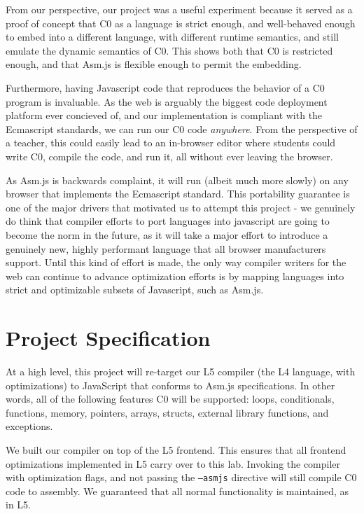 \documentclass[twoside]{article}
\begin{document}
\begin{multicols}{2}
From our perspective, our project was a useful experiment because it served 
as a proof of concept that C0 as a language is strict enough, and well-behaved
enough to embed into a different language, with different runtime semantics, 
and still emulate the dynamic semantics of C0. This shows
both that C0 is restricted enough, and that Asm.js is flexible enough to permit the 
embedding. 

Furthermore, having Javascript code that reproduces the behavior of a 
C0 program is invaluable. As the web is arguably the biggest code deployment 
platform ever concieved of, and our implementation is compliant with the 
Ecmascript standards, we can run our C0 code \emph{anywhere}. 
From the perspective of a teacher, this could easily lead to an in-browser editor 
where students could write C0, compile the code, and run it, all without ever 
leaving the browser.

As Asm.js is backwards complaint, it will run (albeit much more slowly) on 
any browser that implements the Ecmascript standard. This portability guarantee
is one of the major drivers that motivated us to attempt this project - we
genuinely do think that compiler efforts to port languages into javascript 
are going to become the norm in the future, as it will take a major effort
to introduce a genuinely new, highly performant language that all browser 
manufacturers support. Until this kind of effort is made, the only way compiler
writers for the web can continue to advance optimization efforts is by 
mapping languages into strict and optimizable subsets of Javascript, such as 
Asm.js. 


\section{Project Specification}

At a high level, this project will re-target our L5 compiler (the L4 language,
with optimizations) to JavaScript that conforms to Asm.js specifications. In other
words, all of the following features C0 will be supported: loops, conditionals,
functions, memory, pointers, arrays, structs, external library functions, and
exceptions.

  We built our compiler on top of the L5 frontend. This ensures that all 
  frontend optimizations implemented in L5 carry over to this lab. Invoking
  the compiler with optimization flags, and not passing the \texttt{--asmjs}
  directive will still compile C0 code to assembly. We guaranteed that all
  normal functionality is maintained, as in L5. 


\end{multicols}
\end{document}
